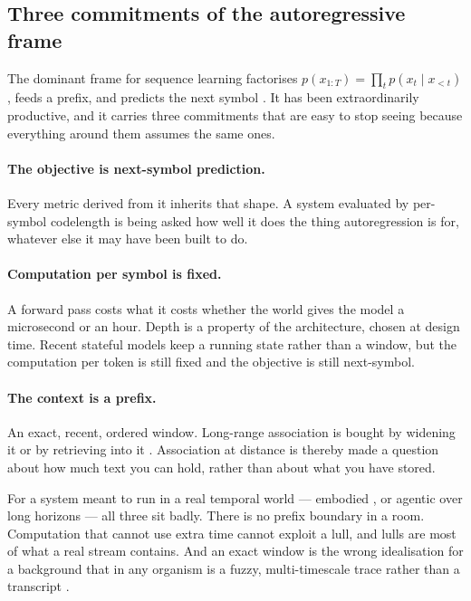 \documentclass[11pt,a4paper]{article}
\theoremstyle{plain}
\theoremstyle{definition}
\theoremstyle{remark}
\begin{document}
\subsection{Three commitments of the autoregressive frame}

The dominant frame for sequence learning factorises
$p(x_{1:T})=\prod_t p(x_t\mid x_{<t})$, feeds a prefix, and predicts the next
symbol \citep{elman1990finding,vaswani2017attention}. It has been extraordinarily
productive, and it carries three commitments that are easy to stop seeing
because everything around them assumes the same ones.

\paragraph{The objective is next-symbol prediction.} Every metric derived from
it inherits that shape. A system evaluated by per-symbol codelength is being
asked how well it does the thing autoregression is for, whatever else it may
have been built to do.

\paragraph{Computation per symbol is fixed.} A forward pass costs what it costs
whether the world gives the model a microsecond or an hour. Depth is a property
of the architecture, chosen at design time. Recent stateful models
\citep{gu2023mamba} keep a running state rather than a window, but the
computation per token is still fixed and the objective is still next-symbol.

\paragraph{The context is a prefix.} An exact, recent, ordered window.
Long-range association is bought by widening it \citep{beltagy2020longformer,%
dai2019transformerxl} or by retrieving into it \citep{borgeaud2022improving,%
weston2015memory}. Association at distance is thereby made a question about how
much text you can hold, rather than about what you have stored.

For a system meant to run in a real temporal world --- embodied
\citep{brooks1991intelligence}, or agentic over long horizons --- all three sit
badly. There is no prefix boundary in a room. Computation that cannot use extra
time cannot exploit a lull, and lulls are most of what a real stream contains.
And an exact window is the wrong idealisation for a background that in any
organism is a fuzzy, multi-timescale trace rather than a transcript
\citep{brainerd2002fuzzy}.
\end{document}
